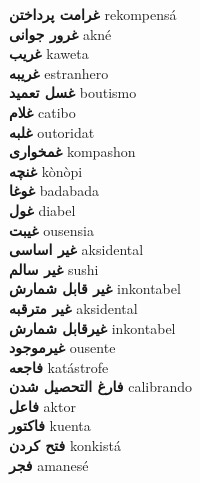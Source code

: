 \textbf{ غرامت پرداختن  } rekompensá \\
\textbf{ غرور جوانی  } akné \\
\textbf{ غریب  } kaweta \\
\textbf{ غریبه  } estranhero \\
\textbf{ غسل تعمید  } boutismo \\
\textbf{ غلام  } catibo \\
\textbf{ غلبه  } outoridat \\
\textbf{ غمخواری  } kompashon \\
\textbf{ غنچه  } kònòpi \\
\textbf{ غوغا  } badabada \\
\textbf{ غول  } diabel \\
\textbf{ غیبت  } ousensia \\
\textbf{ غیر اساسی  } aksidental \\
\textbf{ غیر سالم  } sushi \\
\textbf{ غیر قابل شمارش  } inkontabel \\
\textbf{ غیر مترقبه  } aksidental \\
\textbf{ غیرقابل شمارش  } inkontabel \\
\textbf{ غیرموجود  } ousente \\
\textbf{ فاجعه  } katástrofe \\
\textbf{ فارغ التحصیل شدن  } calibrando \\
\textbf{ فاعل  } aktor \\
\textbf{ فاکتور  } kuenta \\
\textbf{ فتح کردن  } konkistá \\
\textbf{ فجر  } amanesé \\
